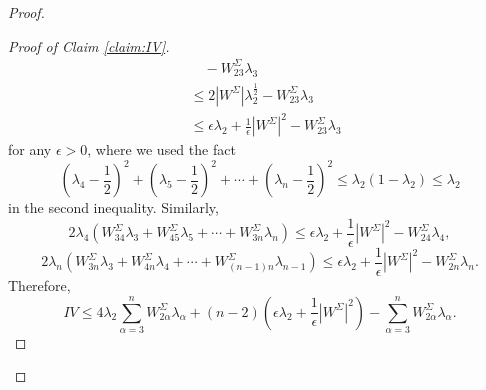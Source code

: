 \documentclass[a4, 12pt]{amsart}
\theoremstyle{plain}
\begin{document}
\begin{proof}
\begin{proof}[Proof of Claim \ref{claim:IV}]
\begin{align*}
			&\quad - W^{\Sigma}_{23}\lambda_{3} \\
			&\leq 2|W^{\Sigma}|\lambda_2^{\frac{1}{2}} - W^{\Sigma}_{23}\lambda_{3} \\
			&\leq \epsilon\lambda_2 + \frac{1}{\epsilon}|W^{\Sigma}|^2 - W^{\Sigma}_{23}\lambda_{3}
		\end{align*}
		for any $\epsilon > 0$, where we used the fact
		\[
		\left(\lambda_{4} - \frac{1}{2}\right)^2 + \left(\lambda_{5} - \frac{1}{2}\right)^2 + \cdots + \left(\lambda_{n} - \frac{1}{2}\right)^2 \leq \lambda_2(1-\lambda_2) \leq \lambda_2
		\]
		in the second inequality. Similarly,
		\[
		2\lambda_4(W^{\Sigma}_{34}\lambda_{3} + W^{\Sigma}_{45}\lambda_{5} + \cdots + W^{\Sigma}_{3n}\lambda_{n}) \leq \epsilon\lambda_2 + \frac{1}{\epsilon}|W^{\Sigma}|^2 - W^{\Sigma}_{24}\lambda_{4},
		\]
		\[
		2\lambda_n(W^{\Sigma}_{3n}\lambda_{3} + W^{\Sigma}_{4n}\lambda_{4} + \cdots + W^{\Sigma}_{(n-1)n}\lambda_{n-1}) \leq \epsilon\lambda_2 + \frac{1}{\epsilon}|W^{\Sigma}|^2 - W^{\Sigma}_{2n}\lambda_{n}.
		\]
		Therefore,
		\[
		IV \leq 4\lambda_{2}\sum_{\alpha=3}^n W^{\Sigma}_{2\alpha}\lambda_{\alpha} + (n-2)\left(\epsilon\lambda_2 + \frac{1}{\epsilon}|W^{\Sigma}|^2\right) - \sum_{\alpha=3}^n W^{\Sigma}_{2\alpha}\lambda_{\alpha}.
		\]
		

\end{proof}
\end{proof}
\end{document}
